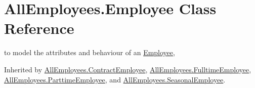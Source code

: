 \hypertarget{class_all_employees_1_1_employee}{\section{All\-Employees.\-Employee Class Reference}
\label{class_all_employees_1_1_employee}
}


to model the attributes and behaviour of an \hyperlink{class_all_employees_1_1_employee}{Employee},  




Inherited by \hyperlink{class_all_employees_1_1_contract_employee}{All\-Employees.\-Contract\-Employee}, \hyperlink{class_all_employees_1_1_fulltime_employee}{All\-Employees.\-Fulltime\-Employee}, \hyperlink{class_all_employees_1_1_parttime_employee}{All\-Employees.\-Parttime\-Employee}, and \hyperlink{class_all_employees_1_1_seasonal_employee}{All\-Employees.\-Seasonal\-Employee}.

